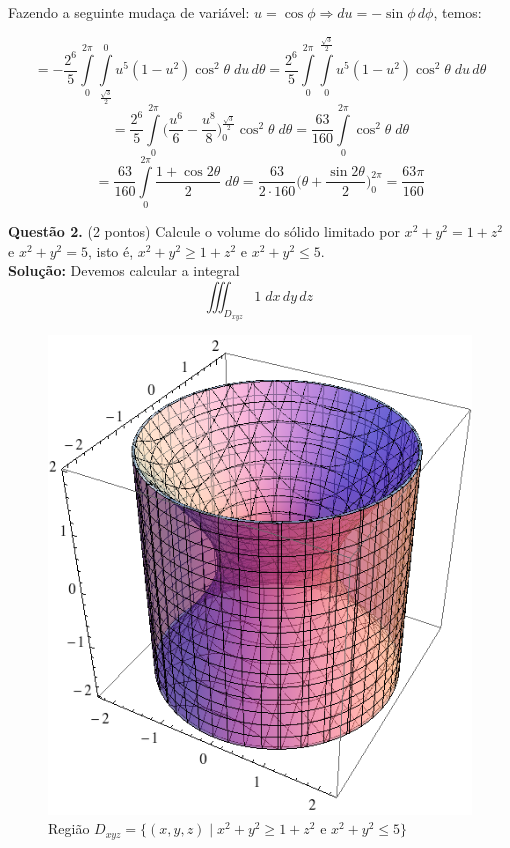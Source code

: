 \documentclass[12pt,a4paper]{article}
\begin{document}
Fazendo a seguinte mudaça de variável: $u = \cos\phi \Rightarrow du = -\sin\phi \, d\phi $, temos:

$$ = -\frac{2^6}{5} \int\limits_{0}^{2\pi} \int\limits_{\frac{\sqrt{3}}{2}}^{0}  u^5 (1 - u^2) \cos^2\theta \;du\,d\theta = \frac{2^6}{5} \int\limits_{0}^{2\pi} \int\limits_{0}^{\frac{\sqrt{3}}{2}}  u^5 (1 - u^2) \cos^2\theta \;du\,d\theta $$
$$ = \frac{2^6}{5} \int\limits_{0}^{2\pi}  \Big( \frac{u^6}{6} - \frac{u^8}{8} \Big)_{0}^{\frac{\sqrt{3}}{2}} \cos^2\theta \;d\theta = \frac{63}{160} \int\limits_{0}^{2\pi} \cos^2\theta \;d\theta $$
$$ = \frac{63}{160} \int\limits_{0}^{2\pi} \frac{1+\cos 2\theta}{2}  \; d\theta = \frac{63}{2\cdot 160} \Big( \theta + \frac{\sin 2\theta}{2} \Big)_{0}^{2\pi} = \frac{63 \pi}{160} $$

\newpage


\textbf{Quest\~{a}o 2.} (2 pontos) Calcule o volume do sólido limitado por $x^2 + y^2 = 1 + z^2$ e $x^2 + y^2 = 5$, isto é, $x^2 + y^2 \geq 1 + z^2$ e $x^2 + y^2 \leq 5$. \\

\textbf{Solução:}
\linebreak
Devemos calcular a integral
\begin{equation}
 \iiint_{D_{xyz}}{1}\;dx\,dy\,dz \
\label{eq:integral}
\end{equation}

\begin{figure}[h!]
	\centering
	\includegraphics[scale=0.3]{Fig2.png}  
	\caption{Regi\~{a}o $ D_{xyz} = \lbrace(x, y, z)\mid x^2 + y^2 \geq 1 + z^2 $ e $ x^2 + y^2 \leq 5 \rbrace $}
	\label{fig:figura2}
\end{figure}
\end{document}
